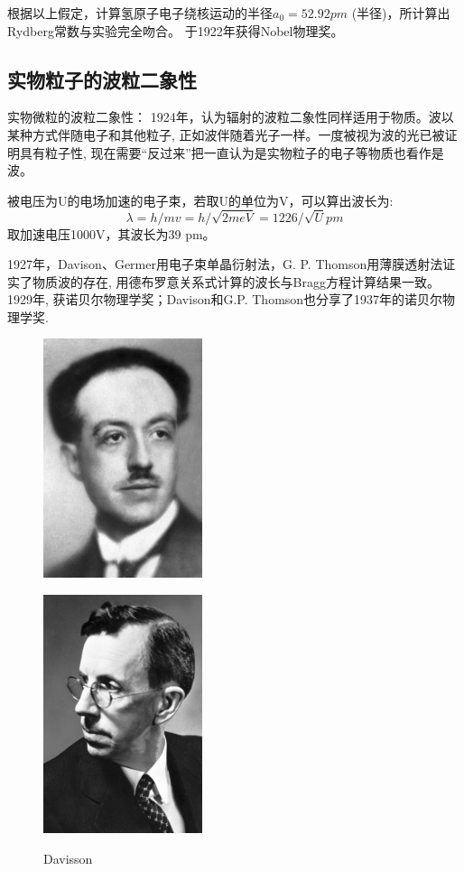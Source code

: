 根据以上假定，计算氢原子电子绕核运动的半径$ a_0 = 52.92 pm$ (\bohr 半径)，所计算出Rydberg常数与实验完全吻合。
\bohr 于1922年获得Nobel物理奖。

\subsection{实物粒子的波粒二象性}
实物微粒的波粒二象性：
1924年，\deB 认为辐射的波粒二象性同样适用于物质。波以某种方式伴随电子和其他粒子, 正如波伴随着光子一样。一度被视为波的光已被证明具有粒子性, 现在需要“反过来”把一直认为是实物粒子的电子等物质也看作是波。

\begin{statT}[\deB 关系]
\end{statT}

\begin{exT}
被电压为U的电场加速的电子束，若取U的单位为V，可以算出\deB 波长为: $$ \lambda = h/mv = h/ \sqrt{2meV} = 1226/ \sqrt{U} pm $$ 
取加速电压1000V，其\deB 波长为39 pm。
\end{exT}

1927年，Davison、Germer用电子束单晶衍射法，G. P. Thomson用薄膜透射法证实了物质波的存在, 用德布罗意关系式计算的波长与Bragg方程计算结果一致。1929年, \deB 获诺贝尔物理学奖；Davison和G.P. Thomson也分享了1937年的诺贝尔物理学奖.


\begin{figure}[!ht]
\centering
\includegraphics[height=7cm]{pic/de_Broglie.jpg}\\
\caption{\deB }
\end{figure}

\begin{figure}[!ht]
\centering
\includegraphics[height=7cm]{pic/davisson.jpg}\\
\caption{Davisson}
\end{figure}

